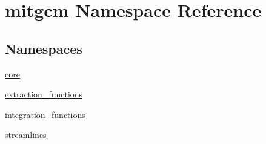 \hypertarget{namespacemitgcm}{\section{mitgcm Namespace Reference}
\label{namespacemitgcm}
}
\subsection*{Namespaces}
\begin{DoxyCompactItemize}
\item 
 \hyperlink{namespacemitgcm_1_1core}{core}
\item 
 \hyperlink{namespacemitgcm_1_1extraction__functions}{extraction\+\_\+functions}
\item 
 \hyperlink{namespacemitgcm_1_1integration__functions}{integration\+\_\+functions}
\item 
 \hyperlink{namespacemitgcm_1_1streamlines}{streamlines}
\end{DoxyCompactItemize}
